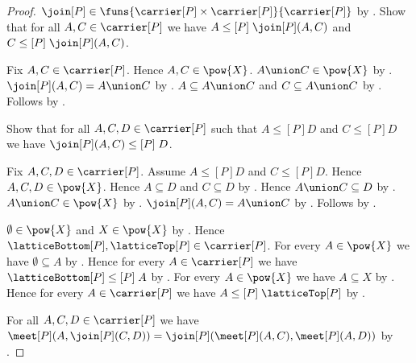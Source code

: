 \begin{proof}
    $\join[P]\in
        \funs{\carrier[P]\times\carrier[P]}{\carrier[P]}$ by
        .
    Show that for all $A,C\in\carrier[P]$ we have
        $A\mathrel{\leq[P]}\join[P](A,C)$ and
        $C\mathrel{\leq[P]}\join[P](A,C)$.
    \begin{subproof}
        Fix $A,C\in\carrier[P]$.
        Hence $A,C\in\pow{X}$.
        $A\union C\in\pow{X}$ by
            .
        $\join[P](A,C)=A\union C$ by
            .
        $A\subseteq A\union C$ and $C\subseteq A\union C$ by
            .
        Follows by
            .
    \end{subproof}
    Show that for all $A,C,D\in\carrier[P]$ such that
        $A\mathrel{\leq[P]}D$ and $C\mathrel{\leq[P]}D$ we have
        $\join[P](A,C)\mathrel{\leq[P]}D$.
    \begin{subproof}
        Fix $A,C,D\in\carrier[P]$.
        Assume $A\mathrel{\leq[P]}D$ and $C\mathrel{\leq[P]}D$.
        Hence $A,C,D\in\pow{X}$.
        Hence $A\subseteq D$ and $C\subseteq D$ by
            .
        Hence $A\union C\subseteq D$ by .
        $A\union C\in\pow{X}$ by
            .
        $\join[P](A,C)=A\union C$ by
            .
        Follows by
            .
    \end{subproof}

    $\emptyset\in\pow{X}$ and $X\in\pow{X}$ by
        .
    Hence $\latticeBottom[P],\latticeTop[P]\in\carrier[P]$.
    For every $A\in\pow{X}$ we have $\emptyset\subseteq A$ by
        .
    Hence for every $A\in\carrier[P]$ we have
        $\latticeBottom[P]\mathrel{\leq[P]}A$ by
        .
    For every $A\in\pow{X}$ we have $A\subseteq X$ by
        .
    Hence for every $A\in\carrier[P]$ we have
        $A\mathrel{\leq[P]}\latticeTop[P]$ by
        .

    For all $A,C,D\in\carrier[P]$ we have
        $\meet[P](A,\join[P](C,D))
            =\join[P](\meet[P](A,C),\meet[P](A,D))$ by
        .


\end{proof}
